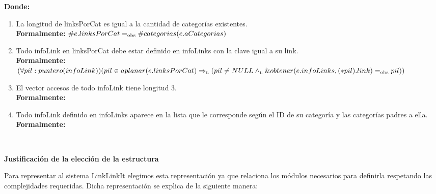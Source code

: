\documentclass[10pt, a4paper]{article}
\newcommand{\modTitulo}[1]{
  \vspace*{1ex}\par\noindent\textbf{\large #1}\par
}
\begin{document}
\mbox{}

{\bf Donde:}

\begin{enumerate}
  \item La longitud de linksPorCat es igual a la cantidad de categor\'ias existentes.\\
		{\bf Formalmente:} $\#e.linksPorCat =_{\mathrm{obs}} \#categorias(e.aCategorias)$

  \item Todo infoLink en linksPorCat debe estar definido en infoLinks con la clave igual a su link.\\
		{\bf Formalmente:} $(\forall pil:puntero(infoLink))(pil \in aplanar(e.linksPorCat) \Rightarrow_{\mathrm{\scriptscriptstyle{L}}} (pil \neq NULL \land_{\mathrm{\scriptscriptstyle{L}}} \&obtener(e.infoLinks, (*pil).link) =_{\mathrm{obs}} pil))$

  \item El vector accesos de todo infoLink tiene longitud 3.\\
		{\bf Formalmente:} 

  \item Todo infoLink definido en infoLinks aparece en la lista que le corresponde seg\'un el ID de su categor\'ia y las categor\'ias padres a ella.\\
		{\bf Formalmente:}
\end{enumerate}

~

\modTitulo{Justificaci\'on de la elecci\'on de la estructura}
Para representar al sistema LinkLinkIt elegimos esta representaci\'on ya que relaciona los m\'odulos necesarios para definirla respetando las complejidades requeridas. Dicha representaci\'on se explica de la siguiente manera:
\end{document}
